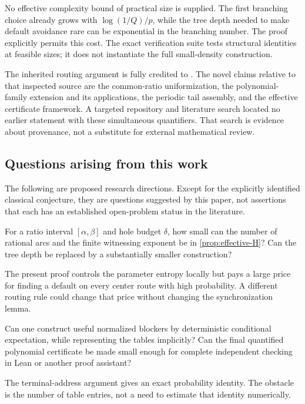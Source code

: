 No effective complexity bound of practical size is supplied. The first
branching choice already grows with $\log(1/Q)/p$, while the tree depth
needed to make default avoidance rare can be exponential in the
branching number. The proof explicitly permits this cost. The exact
verification suite tests structural identities at feasible sizes; it
does not instantiate the full small-density construction.

The inherited routing argument is fully credited to \cite{OpenAI84}.
The novel claims relative to that inspected source are the common-ratio
uniformization, the polynomial-family extension and its applications,
the periodic tail assembly, and the effective certificate framework.
A targeted repository and literature search located no earlier statement
with these simultaneous quantifiers. That search is evidence about
provenance, not a substitute for external mathematical review.

\subsection{Questions arising from this work}

The following are proposed research directions. Except for the explicitly
identified classical conjecture, they are questions suggested by this
paper, not assertions that each has an established open-problem status
in the literature.

\begin{question}
For a ratio interval $[\alpha,\beta]$ and hole budget $\delta$, how small
can the number of rational arcs and the finite witnessing exponent be
in \cref{prop:effective-H}? Can the tree depth be replaced by a
substantially smaller construction?
\end{question}
The present proof controls the parameter entropy locally but pays a
large price for finding a default on every center route with high
probability. A different routing rule could change that price without
changing the synchronization lemma.

\begin{question}
Can one construct useful normalized blockers by deterministic
conditional expectation, while representing the tables implicitly?
Can the final quantified polynomial certificate be made small enough
for complete independent checking in Lean or another proof assistant?
\end{question}
The terminal-address argument gives an exact probability identity.
The obstacle is the number of table entries, not a need to estimate
that identity numerically.

